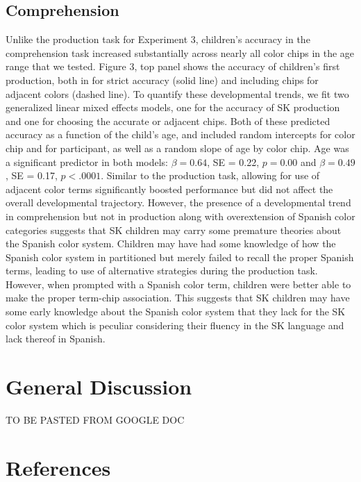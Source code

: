 \documentclass[,man,floatsintext]{apa6}
\theoremstyle{definition}
\theoremstyle{definition}
\theoremstyle{definition}
\theoremstyle{remark}
\begin{document}
\subsection{Comprehension}\label{comprehension-1}

Unlike the production task for Experiment 3, children's accuracy in the
comprehension task increased substantially across nearly all color chips
in the age range that we tested. Figure 3, top panel shows the accuracy
of children's first production, both in for strict accuracy (solid line)
and including chips for adjacent colors (dashed line). To quantify these
developmental trends, we fit two generalized linear mixed effects
models, one for the accuracy of SK production and one for choosing the
accurate or adjacent chips. Both of these predicted accuracy as a
function of the child's age, and included random intercepts for color
chip and for participant, as well as a random slope of age by color
chip. Age was a significant predictor in both models: \(\beta = 0.64\),
SE = 0.22, \(p = 0.00\) and \(\beta = 0.49\), SE = 0.17, \(p < .0001\).
Similar to the production task, allowing for use of adjacent color terms
significantly boosted performance but did not affect the overall
developmental trajectory. However, the presence of a developmental trend
in comprehension but not in production along with overextension of
Spanish color categories suggests that SK children may carry some
premature theories about the Spanish color system. Children may have had
some knowledge of how the Spanish color system in partitioned but merely
failed to recall the proper Spanish terms, leading to use of alternative
strategies during the production task. However, when prompted with a
Spanish color term, children were better able to make the proper
term-chip association. This suggests that SK children may have some
early knowledge about the Spanish color system that they lack for the SK
color system which is peculiar considering their fluency in the SK
language and lack thereof in Spanish.

\section{General Discussion}\label{general-discussion}

TO BE PASTED FROM GOOGLE DOC

\newpage

\section{References}\label{references}
\end{document}
